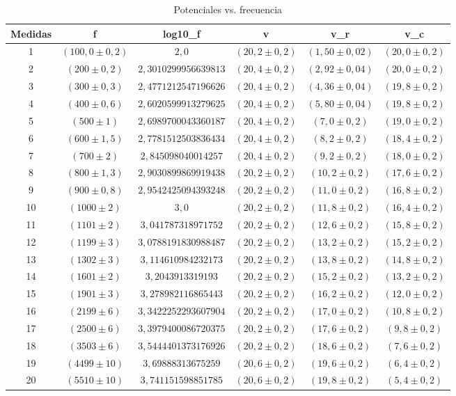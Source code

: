 \begin{table}[H]
\centering
\begin{tabular}{|c|c|c|c|c|c|}
\hline
Medidas & f & log10_f & v & v_r & v_c  \\
\hline
1 & $(100,0 \pm 0,2)$ & $2,0$ & $(20,2 \pm 0,2)$ & $(1,50 \pm 0,02)$ & $(20,0 \pm 0,2)$ \\
2 & $(200 \pm 0,2)$ & $2,3010299956639813$ & $(20,4 \pm 0,2)$ & $(2,92 \pm 0,04)$ & $(20,0 \pm 0,2)$  \\
3 & $(300 \pm 0,3)$ & $2,4771212547196626$ & $(20,4 \pm 0,2)$ & $(4,36 \pm 0,04)$ & $(19,8 \pm 0,2)$  \\
4 & $(400 \pm 0,6)$ & $2,6020599913279625$ & $(20,4 \pm 0,2)$ & $(5,80 \pm 0,04)$ & $(19,8 \pm 0,2)$  \\
5 & $(500 \pm 1)$ & $2,6989700043360187$ & $(20,4 \pm 0,2)$ & $(7,0 \pm 0,2)$ & $(19,0 \pm 0,2)$ \\
6 & $(600 \pm 1,5)$ & $2,7781512503836434$  & $(20,4 \pm 0,2)$ & $(8,2 \pm 0,2)$ & $(18,4 \pm 0,2)$ \\
7 & $(700 \pm 2)$ & $2,845098040014257$ & $(20,4 \pm 0,2)$ & $(9,2 \pm 0,2)$ & $(18,0 \pm 0,2)$ \\
8 & $(800 \pm 1,3)$ & $2,9030899869919438$ & $(20,2 \pm 0,2)$ & $(10,2 \pm 0,2)$ & $(17,6 \pm 0,2)$ \\
9 & $(900 \pm 0,8)$ & $2,9542425094393248$ & $(20,2 \pm 0,2)$ & $(11,0 \pm 0,2)$ & $(16,8 \pm 0,2)$ \\
10 & $(1000 \pm 2)$ & $3,0$ & $(20,2 \pm 0,2)$ & $(11,8 \pm 0,2)$ & $(16,4 \pm 0,2)$ \\
11 & $(1101 \pm 2)$ & $3,041787318971752$ & $(20,2 \pm 0,2)$ & $(12,6 \pm 0,2)$ & $(15,8 \pm 0,2)$ \\
12 & $(1199 \pm 3)$ & $3,0788191830988487$ & $(20,2 \pm 0,2)$ & $(13,2 \pm 0,2)$ & $(15,2 \pm 0,2)$ \\
13 & $(1302 \pm 3)$ & $3,114610984232173$ & $(20,2 \pm 0,2)$ & $(13,8 \pm 0,2)$ & $(14,8 \pm 0,2)$ \\
14 & $(1601 \pm 2)$ & $3,2043913319193$ & $(20,2 \pm 0,2)$ & $(15,2 \pm 0,2)$ & $(13,2 \pm 0,2)$ \\
15 & $(1901 \pm 3)$ & $3,278982116865443$ & $(20,2 \pm 0,2)$ & $(16,2 \pm 0,2)$ & $(12,0 \pm 0,2)$ \\
16 & $(2199 \pm 6)$ & $3,3422252293607904$ & $(20,2 \pm 0,2)$ & $(17,0 \pm 0,2)$ & $(10,8 \pm 0,2)$ \\
17 & $(2500 \pm 6)$ & $3,3979400086720375$ & $(20,2 \pm 0,2)$ & $(17,6 \pm 0,2)$ & $(9,8 \pm 0,2)$ \\
18 & $(3503 \pm 6)$ & $3,5444401373176926$ & $(20,2 \pm 0,2)$ & $(18,6 \pm 0,2)$ & $(7,6 \pm 0,2)$ \\
19 & $(4499 \pm 10)$ & $3,69888313675259$ & $(20,6 \pm 0,2)$ & $(19,6 \pm 0,2)$ & $(6,4 \pm 0,2)$ \\
20 & $(5510 \pm 10)$ & $3,741151598851785$ & $(20,6 \pm 0,2)$ & $(19,8 \pm 0,2)$ & $(5,4 \pm 0,2)$ \\
\hline
\end{tabular}
\caption{Potenciales vs. frecuencia}
\label{tab:Potenciales vs. frecuencia}
\end{table}